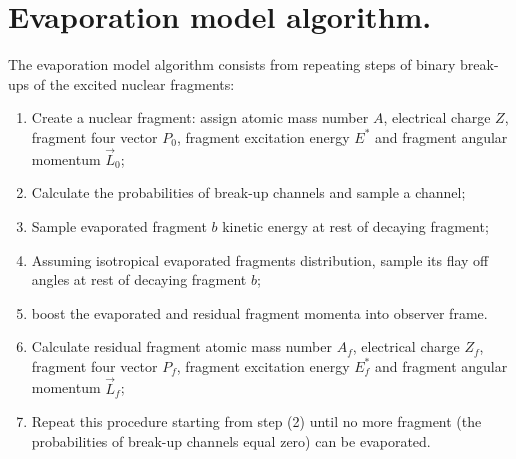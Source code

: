 \section{Evaporation model algorithm.}

 The evaporation model algorithm consists 
 from repeating steps of binary break-ups of 
the excited nuclear fragments:
\begin{enumerate}
\item Create a nuclear fragment: assign atomic mass number $A$, electrical 
charge $Z$, fragment four vector $P_0$, fragment excitation energy $E^{*}$ and 
fragment angular momentum $\vec{L}_0$;
\item Calculate the probabilities of break-up channels and 
sample a channel;
\item Sample evaporated fragment $b$ kinetic energy at rest of decaying fragment;
\item Assuming isotropical evaporated fragments distribution, sample 
its flay off angles at rest of decaying fragment $b$;
\item boost the evaporated and residual fragment momenta into observer frame.
\item Calculate residual fragment  atomic mass number $A_f$, electrical 
charge $Z_f$, fragment four vector $P_f$, fragment excitation energy 
$E_f^{*}$ and 
fragment angular momentum $\vec{L}_f$;
\item Repeat this procedure starting from step (2)
 until no more fragment (the probabilities of break-up channels 
 equal zero) can be evaporated.
\end{enumerate}
